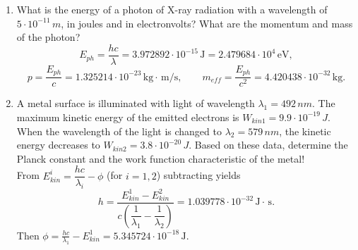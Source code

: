 \documentclass[a4paper,12pt]{letter}
\begin{document}
\begin{enumerate}
\begin{enumerate}
\item What is the power of the laser?\\

 $$P=E/\tau=4.00\cdot 10^{7}\,\text{W}.$$

\item How many photons strike the metal surface?\\

 Photon energy $E_{\,\text{ph}}=hc/\lambda=3.310743\cdot 10^{-19}\,\text{J}$. Number of photons in the pulse $N=E/E_{\,\text{ph}}=4.832752\cdot 10^{19}.$\\

\pagebreak
\item  What is the maximum velocity of the electrons ejected from the metal by the light, if the work function is $ 4 \cdot 10^{-19} \,J$?     (Electron mass: $ m_{e} = 9.11 \cdot 10^{-31} \,kg$)\\

 Maximum kinetic energy $E_{kin}^{\max}=E_{ph}-\phi=-6.892569\cdot 10^{-20}\,\text{J}$. %
Therefore, no electrons are ejected from the metal by the light with these parameters. 
\end{enumerate}

\item What is the energy of a photon of X-ray radiation with a wavelength of $ 5\cdot10^{-11}\,m$,  in joules and in electronvolts?  What are the momentum and mass of the photon?\\

$$E_{ph}=\frac{hc}{\lambda}=3.972892\cdot 10^{-15}\,\text{J}=2.479684\cdot 10^{4}\,\text{eV}, $$
$$ p=\frac{E_{ph}}{c}=1.325214\cdot 10^{-23}\,\text{kg}\cdot\,\text{m/s},\qquad m_{eff}=\frac{E_{ph}}{c^{2}}=4.420438\cdot 10^{-32}\,\text{kg}. $$

\item A metal surface is illuminated with light of wavelength $ \lambda_{1} = 492\,nm $.  The maximum kinetic energy of the emitted electrons is $ W_{kin1} = 9.9 \cdot 10^{-19} \,J$.  When the wavelength of the light is changed to $ \lambda_{2} = 579\,nm $, the kinetic energy decreases to $ W_{kin2} =3.8 \cdot 10^{-20} \,J$.  Based on these data, determine the Planck constant and the work function characteristic of the metal!\\

 From $E_{kin}^{i} = \dfrac{hc}{\lambda_{i}}-\phi$ (for $i=1,2$) subtracting yields
$$ h=\frac{E_{kin}^1-E_{kin}^2}{c\left(\dfrac{1}{\lambda_{1}}-\dfrac{1}{\lambda_{2}}\right)}=1.039778\cdot 10^{-32}\,\text{J}\cdot\,\text{s}. $$
Then $\phi=\frac{hc}{\lambda_{1}}-E_{kin}^1=5.345724\cdot 10^{-18}\,\text{J}.$


\end{enumerate}
\end{document}
